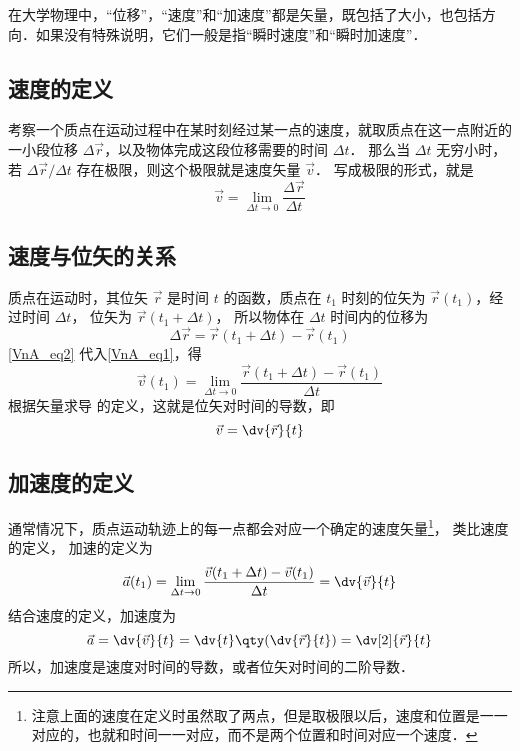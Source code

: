

在大学物理中，“位移”，“速度”和“加速度”都是矢量，既包括了大小，也包括方向．如果没有特殊说明，它们一般是指“瞬时速度”和“瞬时加速度”．

\subsection{速度的定义}
考察一个质点在运动过程中在某时刻经过某一点的速度，就取质点在这一点附近的一小段位移 $\Delta\vec r$，以及物体完成这段位移需要的时间 $\Delta t$． 那么当 $\Delta t$ 无穷小时，若 $\Delta \vec r/\Delta t$ 存在极限，则这个极限就是速度矢量 $\vec v$． 写成极限的形式，就是
\begin{equation}\label{VnA_eq1}
\vec v = \lim_{\Delta t \to 0} \frac{\Delta \vec r}{\Delta t}
\end{equation}

\subsection{速度与位矢的关系}

质点在运动时，其位矢 $\vec r$ 是时间 $t$ 的函数，质点在 ${t_1}$ 时刻的位矢为 $\vec r(t_1)$，经过时间 $\Delta t$， 位矢为 $\vec r(t_1 + \Delta t)$， 所以物体在 $\Delta t$ 时间内的位移为
\begin{equation}\label{VnA_eq2}
\Delta \vec r = \vec r (t_1 + \Delta t) - \vec r (t_1)
\end{equation}
\autoref{VnA_eq2} 代入\autoref{VnA_eq1}，得
\begin{equation}\label{VnA_eq3}
\vec v(t_1) = \lim_{\Delta t \to 0} \frac{\vec r (t_1 + \Delta t) - \vec r(t_1)}{\Delta t}
\end{equation}
根据矢量求导 的定义，这就是位矢对时间的导数，即
\begin{equation}
\vec v = \dv{\vec r}{t}
\end{equation}


\subsection{加速度的定义}

通常情况下，质点运动轨迹上的每一点都会对应一个确定的速度矢量\footnote{注意上面的速度在定义时虽然取了两点，但是取极限以后，速度和位置是一一对应的，也就和时间一一对应，而不是两个位置和时间对应一个速度．}， 类比速度的定义， 加速的定义为
\begin{equation}
\vec a(t_1) = \lim_{\Delta t \to 0} \frac{\vec v(t_1 + \Delta t) - \vec v (t_1)}{\Delta t} = \dv{\vec v}{t}
\end{equation}
结合速度的定义，加速度为
\begin{equation}
\vec a = \dv{\vec v}{t} = \dv{t} \qty( \dv{\vec r}{t} ) = \dv[2]{\vec r}{t}
\end{equation}
所以，加速度是速度对时间的导数，或者位矢对时间的二阶导数．


